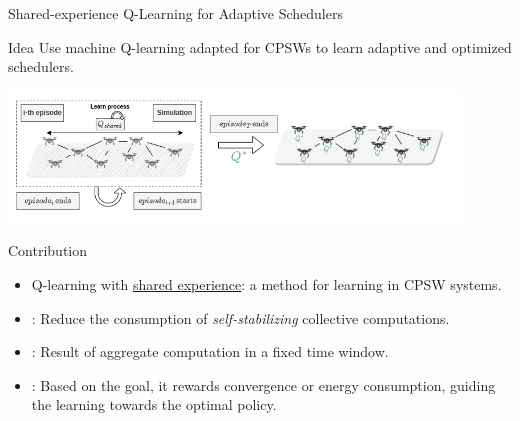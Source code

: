 \documentclass[presentation, 9pt,169]{beamer}\mode<presentation>{\usetheme{AMSBolognaFC}}
\begin{document}
\begin{frame}{Shared-experience Q-Learning for Adaptive Schedulers}
\begin{alertblock}{Idea}
Use machine Q-learning adapted for CPSWs to learn adaptive and optimized schedulers.
\end{alertblock}
\begin{center}
  \includegraphics[width=0.9\textwidth]{img/algorithm-learning.png}
\end{center}
\begin{exampleblock}{Contribution}
\begin{itemize}
\item Q-learning with \underline{shared experience}: a method for learning in CPSW systems.
\item {}: Reduce the consumption of \emph{self-stabilizing} collective computations.
\item {}: Result of aggregate computation in a fixed time window.
\item {}: Based on the goal, it rewards convergence or energy consumption, guiding the learning towards the optimal policy.
\end{itemize}
\end{exampleblock}
\end{frame}
\end{document}
